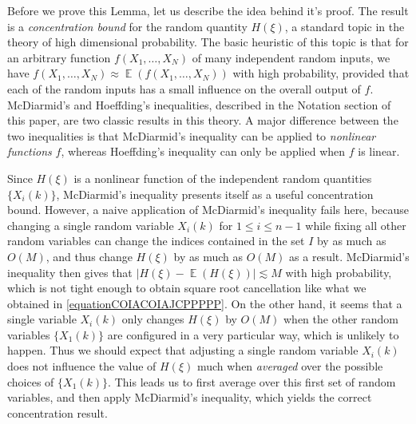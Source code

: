 \documentclass[dvipsnames,letterpaper,12pt]{article}
\numberwithin{equation}{section}
\numberwithin{theorem}{section}
\DeclareMathOperator{\EE}{\mathbb{E}}
\begin{document}
Before we prove this Lemma, let us describe the idea behind it's proof. The result is a \emph{concentration bound} for the random quantity $H(\xi)$, a standard topic in the theory of high dimensional probability. The basic heuristic of this topic is that for an arbitrary function $f(X_1,\dots,X_N)$ of many independent random inputs, we have $f(X_1,\dots,X_N) \approx \EE(f(X_1,\dots,X_N))$ with high probability, provided that each of the random inputs has a small influence on the overall output of $f$. McDiarmid's and Hoeffding's inequalities, described in the Notation section of this paper, are two classic results in this theory. A major difference between the two inequalities is that McDiarmid's inequality can be applied to \emph{nonlinear functions} $f$, whereas Hoeffding's inequality can only be applied when $f$ is linear.

Since $H(\xi)$ is a nonlinear function of the independent random quantities $\{ X_i(k) \}$, McDiarmid's inequality presents itself as a useful concentration bound. However, a naive application of McDiarmid's inequality fails here, because changing a single random variable $X_i(k)$ for $1 \leq i \leq n-1$ while fixing all other random variables can change the indices contained in the set $I$ by as much as $O(M)$, and thus change $H(\xi)$ by as much as $O(M)$ as a result. McDiarmid's inequality then gives that $|H(\xi) - \EE(H(\xi))| \lesssim M$ with high probability, which is not tight enough to obtain square root cancellation like what we obtained in \eqref{equationCOIACOIAJCPPPPP}. On the other hand, it seems that a single variable $X_i(k)$ only changes $H(\xi)$ by $O(M)$ when the other random variables $\{ X_1(k) \}$ are configured in a very particular way, which is unlikely to happen. Thus we should expect that adjusting a single random variable $X_i(k)$ does not influence the value of $H(\xi)$ much when \emph{averaged} over the possible choices of $\{ X_1(k) \}$. This leads us to first average over this first set of random variables, and then apply McDiarmid's inequality, which yields the correct concentration result.
\end{document}
